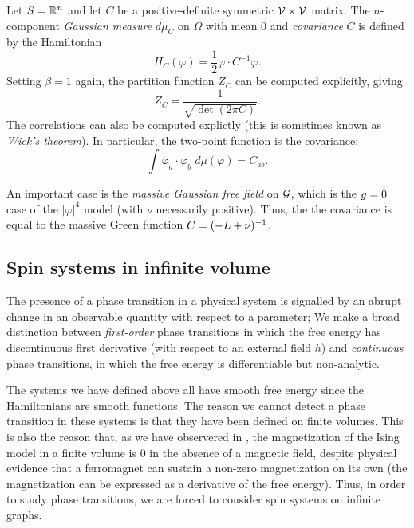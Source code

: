 \begin{example}
Let $S = {\mathbb R}^n$ and let $C$ be a positive-definite symmetric $\mathcal{V}\times\mathcal{V}$
matrix. The $n$-component \emph{Gaussian measure} $d\mu_C$ on
$\Omega$ with mean $0$ and \emph{covariance} $C$ is defined by the Hamiltonian
\begin{equation}
H_C(\varphi) = \frac{1}{2} \varphi \cdot C^{-1} \varphi.
\end{equation}
Setting $\beta = 1$ again, the partition function $Z_C$ can be computed explicitly,
giving
\begin{equation}
Z_C
  =
\frac{1}{\sqrt{\det(2\pi C)}}.
\end{equation}
The correlations can also be computed explictly (this is sometimes known as
\emph{Wick's theorem}). In particular, the two-point function is the covariance:
\begin{equation}
\label{e:wick}
\int \varphi_a \cdot \varphi_b \; d\mu(\varphi) = C_{ab}.
\end{equation}

An important case is the \emph{massive Gaussian free field} on $\mathcal{G}$,
which is the $g = 0$ case of the $|\varphi|^4$ model (with $\nu$ necessarily positive).
Thus, the the covariance is equal to the massive Green function $C = (-L + \nu)^{-1}$.
\end{example}


\subsection{Spin systems in infinite volume}

The presence of a phase transition in a physical system is signalled by an abrupt
change in an observable quantity with respect to a parameter;
We make a broad distinction between
\emph{first-order} phase transitions in which the free energy has discontinuous first
derivative (with respect to an external field $h$) and \emph{continuous} phase transitions,
in which the free energy is differentiable but non-analytic.

The systems we have defined above all
have smooth free energy since the Hamiltonians are smooth functions. The reason we cannot
detect a phase transition in these systems is that they have been defined on finite volumes.
This is also the reason that, as we have observered in \REF, the magnetization of the Ising
model in a finite volume is $0$ in the absence of a magnetic field, despite physical evidence
that a ferromagnet can sustain a non-zero magnetization on its own (the magnetization can
be expressed as a derivative of the free energy).
Thus, in order to study phase transitions, we are forced to consider
spin systems on infinite graphs.

